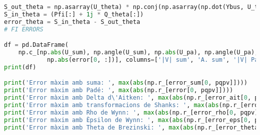 \begin{lstlisting}[language=Python,numbers=none]
S_out_theta = np.asarray(U_theta) * np.conj(np.asarray(np.dot(Ybus, U_theta)))
S_in_theta = (Pfi[:] + 1j * Q_theta[:])
error_theta = S_in_theta - S_out_theta
# FI ERRORS

df = pd.DataFrame(
    np.c_[np.abs(U_sum), np.angle(U_sum), np.abs(U_pa), np.angle(U_pa), np.real(Sig_re), np.real(Sig_im),
            np.abs(error[0, :])], columns=['|V| sum', 'A. sum', '|V| Padé', 'A. Padé', 'Sigma re', 'Sigma im', 'S error'])
print(df)

print('Error màxim amb suma: ', max(abs(np.r_[error_sum[0, pqpv]])))
print('Error màxim amb Padé: ', max(abs(np.r_[error[0, pqpv]])))
print('Error màxim amb Delta d\'Aitken: ', max(abs(np.r_[error_ait[0, pqpv]])))
print('Error màxim amb transformacions de Shanks: ', max(abs(np.r_[error_shanks[0, pqpv]])))
print('Error màxim amb Rho de Wynn: ', max(abs(np.r_[error_rho[0, pqpv]])))
print('Error màxim amb Èpsilon de Wynn: ', max(abs(np.r_[error_eps[0, pqpv]])))
print('Error màxim amb Theta de Brezinski: ', max(abs(np.r_[error_theta[0, pqpv]])))
\end{lstlisting}

